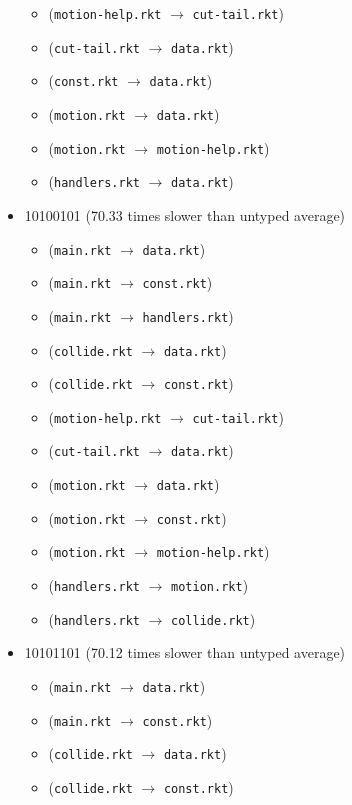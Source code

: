 \documentclass{article}
\newcommand{\mono}[1]{\texttt{#1}}
\begin{document}
\begin{itemize}
\begin{itemize}
  \item (\mono{motion-help.rkt} $\rightarrow$ \mono{cut-tail.rkt})
  \item (\mono{cut-tail.rkt} $\rightarrow$ \mono{data.rkt})
  \item (\mono{const.rkt} $\rightarrow$ \mono{data.rkt})
  \item (\mono{motion.rkt} $\rightarrow$ \mono{data.rkt})
  \item (\mono{motion.rkt} $\rightarrow$ \mono{motion-help.rkt})
  \item (\mono{handlers.rkt} $\rightarrow$ \mono{data.rkt})
  \end{itemize}
\item 10100101 (70.33 times slower than untyped average)
  \begin{itemize}
  \item (\mono{main.rkt} $\rightarrow$ \mono{data.rkt})
  \item (\mono{main.rkt} $\rightarrow$ \mono{const.rkt})
  \item (\mono{main.rkt} $\rightarrow$ \mono{handlers.rkt})
  \item (\mono{collide.rkt} $\rightarrow$ \mono{data.rkt})
  \item (\mono{collide.rkt} $\rightarrow$ \mono{const.rkt})
  \item (\mono{motion-help.rkt} $\rightarrow$ \mono{cut-tail.rkt})
  \item (\mono{cut-tail.rkt} $\rightarrow$ \mono{data.rkt})
  \item (\mono{motion.rkt} $\rightarrow$ \mono{data.rkt})
  \item (\mono{motion.rkt} $\rightarrow$ \mono{const.rkt})
  \item (\mono{motion.rkt} $\rightarrow$ \mono{motion-help.rkt})
  \item (\mono{handlers.rkt} $\rightarrow$ \mono{motion.rkt})
  \item (\mono{handlers.rkt} $\rightarrow$ \mono{collide.rkt})
  \end{itemize}
\item 10101101 (70.12 times slower than untyped average)
  \begin{itemize}
  \item (\mono{main.rkt} $\rightarrow$ \mono{data.rkt})
  \item (\mono{main.rkt} $\rightarrow$ \mono{const.rkt})
  \item (\mono{collide.rkt} $\rightarrow$ \mono{data.rkt})
  \item (\mono{collide.rkt} $\rightarrow$ \mono{const.rkt})

\end{itemize}
\end{itemize}
\end{document}
